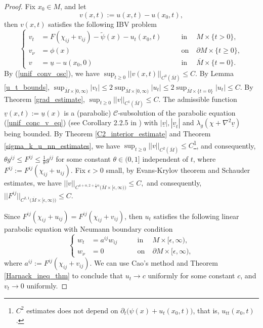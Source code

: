 \documentclass[12pt]{amsart}
\theoremstyle{definition}
\theoremstyle{remark}
\numberwithin{equation}{section}
\begin{document}
\begin{proof}
	Fix $x_0 \in M$, and let $$v(x,t) := u(x, t) - u(x_0, t), $$
	then $v(x, t)$ satisfies the following IBV problem
	\begin{equation}\label{unif_conc_v_eq}
	\left\{
	\begin{aligned}
	v_t &= F(\chi_{ij} + v_{ij}) - \tilde{\psi}(x) - u_t(x_0, t) \qquad &\text{in}&\; M \times \{t>0\}, \\ 
	v_\nu &= \phi(x) \qquad &\text{on}& \; \partial M \times \{t \geq 0\},\\
	v &= \underline{u} - u(x_0, 0) \qquad & \text{in}& \; \overline{M}\times\{t = 0\}.
	\end{aligned}
	\right.
	\end{equation}
	By (\ref{unif_conv_osc}), we have $\sup_{t\geq 0} ||v(x, t)||_{C^0(\overline{M})} \leq C$.
	By Lemma \ref{u_t_bounds}, 
	$\sup_{\overline{M}\times [0, \infty)} |v_t| \leq 2 \sup_{\overline{M}\times [0, \infty)} |u_t| \leq 2\sup_{\overline{M}\times \{t=0\}} |u_t| \leq C.$
	By Theorem \ref{grad_estimate}, $\sup_{t\geq 0} ||v||_{C^{1} (\overline{M})} \leq C$. 
	The admissible function $\underline{v}(x, t) := \underline{u}(x)$ is a (parabolic) $\mathcal{C}$-subsolution of the parabolic equation (\ref{unif_conc_v_eq}) (see Corollary 2.2.5 in \cite{GuoThesis19}) with $|\underline{v}|, |\underline{v}_t|$ and $\lambda_g(\chi + \nabla^2 \underline{v})$ being bounded. 
	By Theorem \ref{C2_interior_estimate} and Theorem \ref{sigma_k_u_nn_estimates}, we have
	$\sup_{t\geq 0} ||v||_{C^{2} (\overline{M})} \leq C$\footnote{$C^2$ estimates does not depend on $\partial_t \big(\psi(x) + u_t(x_0, t)\big)$, that is, $u_{tt}(x_0, t)$.}, 
	and consequently, $\theta g^{ij} \leq F^{ij} \leq \frac{1}{\theta} g^{ij}$ for some constant $\theta \in (0, 1]$ independent of $t$, where $F^{ij} := F^{ij} (\chi_{ij} + u_{ij})$. Fix $\epsilon > 0$ small, by Evans-Krylov theorem and Schauder estimates, we have $||v||_{C^{4+\alpha, 2+\frac{1}{2}\alpha} \big(\overline{M} \times [\epsilon, \infty)\big)} \leq C,$ 
	and consequently, $ ||F^{ij}||_{C^{2, 1}\big(\overline{M} \times [\epsilon, \infty)\big)} \leq C$.
	
	Since $F^{ij}(\chi_{ij} + u_{ij}) = F^{ij}(\chi_{ij} + v_{ij})$, then $u_t$ satisfies the following linear parabolic equation with Neumann boundary condition
	\begin{equation}\label{du/dt_parabolic}
	\left\{
	\begin{aligned}
	w_t &= a^{ij}w_{ij} \qquad &\text{in}&\; M\times [\epsilon, \infty), \\ 
	w_\nu &= 0 \qquad &\text{on}& \; \partial M \times [\epsilon, \infty),  
	\end{aligned}
	\right.
	\end{equation}
	where $a^{ij} := F^{ij}(\chi_{ij} + v_{ij})$.	
	We can use Cao's method \cite{Cao85} and Theorem \ref{Harnack_ineq_thm} to conclude that $u_t \rightarrow c$ uniformly for some constant $c$, and $v_t \rightarrow 0$ uniformly. 
	

\end{proof}
\end{document}
